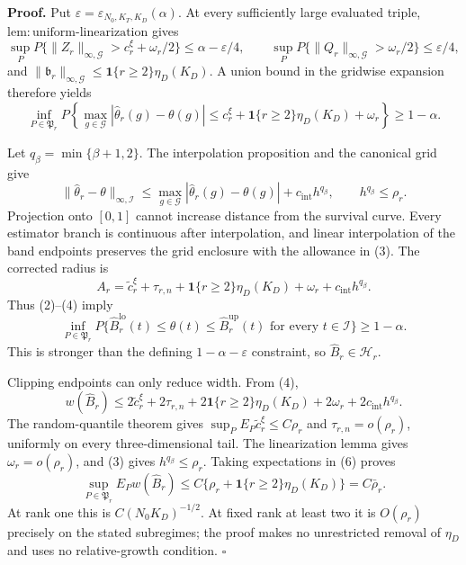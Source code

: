 \textbf{Proof.}
Put \(\varepsilon=\varepsilon_{N_0,K_T,K_D}(\alpha)\).  At every sufficiently
large evaluated triple, \(\mathrm{lem:uniform\mbox{-}linearization}\) gives
\[
 \sup_PP\{\|Z_r\|_{\infty,\mathcal G}>c_r^\xi+\omega_r/2\}
 \le\alpha-\varepsilon/4,
 \qquad
 \sup_PP\{\|Q_r\|_{\infty,\mathcal G}>\omega_r/2\}
 \le\varepsilon/4,                                         \tag{1}
\]
and
\(\|\mathfrak b_r\|_{\infty,\mathcal G}
\le\mathbf1\{r\ge2\}\eta_D(K_D)\).  A union bound in the gridwise
expansion therefore yields
\[
 \inf_{P\in\mathfrak P_r}P\left\{
 \max_{g\in\mathcal G}|\widehat\theta_r(g)-\theta(g)|
 \le c_r^\xi+\mathbf1\{r\ge2\}\eta_D(K_D)+\omega_r
 \right\}\ge1-\alpha.                                     \tag{2}
\]

Let \(q_\beta=\min\{\beta+1,2\}\).  The interpolation proposition and
the canonical grid give
\[
 \|\widehat\theta_r-\theta\|_{\infty,\mathcal I}
 \le\max_{g\in\mathcal G}|\widehat\theta_r(g)-\theta(g)|
 +c_{\mathrm{int}}h^{q_\beta},
 \qquad h^{q_\beta}\le\rho_r.                              \tag{3}
\]
Projection onto \([0,1]\) cannot increase distance from the survival curve.
Every estimator branch is continuous after interpolation, and linear
interpolation of the band endpoints preserves the grid enclosure with the
allowance in (3).  The corrected radius is
\[
 A_r=\widetilde c_r^\xi+\tau_{r,n}
 +\mathbf1\{r\ge2\}\eta_D(K_D)+\omega_r
 +c_{\mathrm{int}}h^{q_\beta}.                             \tag{4}
\]
Thus (2)--(4) imply
\[
 \inf_{P\in\mathfrak P_r}P\{\widehat B_r^{\mathrm{lo}}(t)
 \le\theta(t)\le\widehat B_r^{\mathrm{up}}(t)
 \text{ for every }t\in\mathcal I\}\ge1-\alpha.          \tag{5}
\]
This is stronger than the defining \(1-\alpha-\varepsilon\) constraint, so
\(\widehat B_r\in\mathcal H_r\).

Clipping endpoints can only reduce width.  From (4),
\[
 w(\widehat B_r)
 \le2\widetilde c_r^\xi+2\tau_{r,n}
 +2\mathbf1\{r\ge2\}\eta_D(K_D)+2\omega_r
 +2c_{\mathrm{int}}h^{q_\beta}.                            \tag{6}
\]
The random-quantile theorem gives
\(\sup_PE_P\widetilde c_r^\xi\le C\rho_r\) and
\(\tau_{r,n}=o(\rho_r)\), uniformly on every three-dimensional tail.
The linearization lemma gives \(\omega_r=o(\rho_r)\), and (3) gives
\(h^{q_\beta}\le\rho_r\).  Taking expectations in (6) proves
\[
 \sup_{P\in\mathfrak P_r}E_Pw(\widehat B_r)
 \le C\{\rho_r+\mathbf1\{r\ge2\}\eta_D(K_D)\}
 =C\bar\rho_r.                                             \tag{7}
\]
At rank one this is \(C(N_0K_D)^{-1/2}\).  At fixed rank at least two it
is \(O(\rho_r)\) precisely on the stated subregimes; the proof makes no
unrestricted removal of \(\eta_D\) and uses no relative-growth condition.
\(\square\)